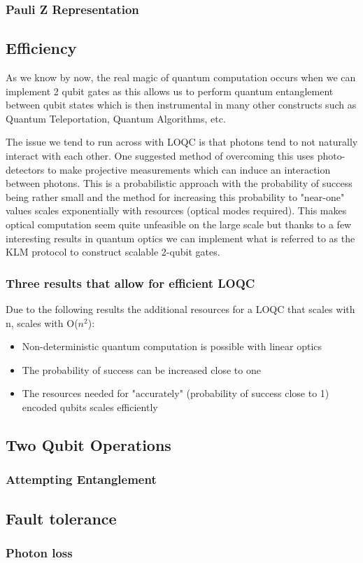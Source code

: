 \subsubsection{Pauli Z Representation}


\subsection{Efficiency}
As we know by now, the real magic of quantum computation occurs when we can implement 2 qubit gates as this allows us to perform quantum entanglement between qubit states which is then instrumental in many other constructs such as Quantum Teleportation, Quantum Algorithms, etc.

The issue we tend to run across with LOQC is that photons tend to not naturally interact with each other. One suggested method of overcoming this uses photo-detectors to make projective measurements which can induce an interaction between photons\cite{Kok:2005jip}. This is a probabilistic approach with the probability of success being rather small and the method for increasing this probability to "near-one" values scales exponentially with resources (optical modes required). This makes optical computation seem quite unfeasible on the large scale but thanks to a few interesting results in quantum optics we can implement what is referred to as the KLM protocol to construct scalable 2-qubit gates.


\subsubsection{Three results that allow for efficient LOQC}
Due to the following results the additional resources for a LOQC that scales with n, scales with O($n^2$):
\begin{itemize}
    \item Non-deterministic quantum computation is possible with linear optics
    \item The probability of success can be increased close to one
    \item The resources needed for "accurately" (probability of success close to 1) encoded qubits scales efficiently  
\end{itemize}


\subsection{Two Qubit Operations}
\subsubsection{Attempting Entanglement}




\subsection{Fault tolerance}
\subsubsection{Photon loss}